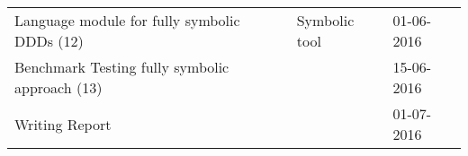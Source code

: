 \begin{center}
\begin{tabular}{@{}lll@{}}
Language module for fully symbolic DDDs (12)   & Symbolic tool                                                               & 01-06-2016 \\
Benchmark Testing fully symbolic approach (13) &                                                                             & 15-06-2016 \\
Writing Report                                 &                                                                             & 01-07-2016 \\ \bottomrule
\end{tabular}
\end{center}

